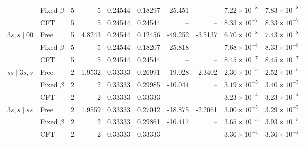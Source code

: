 \begin{longtable}{llrrrrrrrr}
 & Fixed $\beta$ & 5 & 5 & 0.24544 & 0.18297 & -25.451 & -- & $7.22\!\times\!10^{-8}$ & $7.83\!\times\!10^{-8}$\\*
 & CFT & 5 & 5 & 0.24544 & 0.24544 & -- & -- & $8.33\!\times\!10^{-7}$ & $8.33\!\times\!10^{-7}$\\
\addlinespace[3pt]
$3s,s\mid 00$ & Free & 5 & 4.8243 & 0.24544 & 0.12456 & -49.252 & -3.5137 & $6.70\!\times\!10^{-8}$ & $7.43\!\times\!10^{-8}$\\*
 & Fixed $\beta$ & 5 & 5 & 0.24544 & 0.18207 & -25.818 & -- & $7.68\!\times\!10^{-8}$ & $8.33\!\times\!10^{-8}$\\*
 & CFT & 5 & 5 & 0.24544 & 0.24544 & -- & -- & $8.45\!\times\!10^{-7}$ & $8.45\!\times\!10^{-7}$\\
\addlinespace[3pt]
$ss\mid 3s,s$ & Free & 2 & 1.9532 & 0.33333 & 0.26991 & -19.028 & -2.3402 & $2.30\!\times\!10^{-5}$ & $2.52\!\times\!10^{-5}$\\*
 & Fixed $\beta$ & 2 & 2 & 0.33333 & 0.29985 & -10.044 & -- & $3.19\!\times\!10^{-5}$ & $3.40\!\times\!10^{-5}$\\*
 & CFT & 2 & 2 & 0.33333 & 0.33333 & -- & -- & $3.23\!\times\!10^{-4}$ & $3.23\!\times\!10^{-4}$\\
\addlinespace[3pt]
$3s,s\mid ss$ & Free & 2 & 1.9559 & 0.33333 & 0.27042 & -18.875 & -2.2061 & $3.00\!\times\!10^{-5}$ & $3.29\!\times\!10^{-5}$\\*
 & Fixed $\beta$ & 2 & 2 & 0.33333 & 0.29861 & -10.417 & -- & $3.65\!\times\!10^{-5}$ & $3.93\!\times\!10^{-5}$\\*
 & CFT & 2 & 2 & 0.33333 & 0.33333 & -- & -- & $3.36\!\times\!10^{-4}$ & $3.36\!\times\!10^{-4}$\\
\addlinespace[3pt]
\end{longtable}



